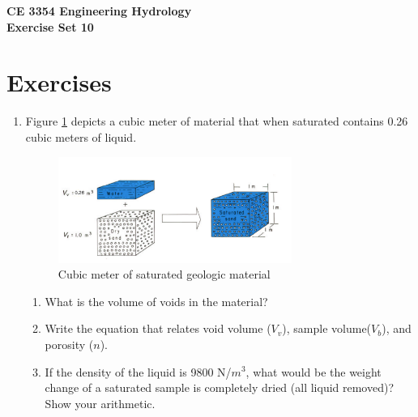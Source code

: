 \documentclass[12pt]{article}
\begin{document}
\begin{center}
{\textbf{{ CE 3354 Engineering Hydrology} \\ {Exercise Set 10}}}
\end{center}

\section*{\small{Exercises}}

\begin{enumerate}
\item Figure \ref{fig:porosity.pdf} depicts a cubic meter of material that when saturated contains 0.26 cubic meters of liquid.
\begin{figure}[h!] %
   \centering
   \includegraphics[width=3in]{porosity.pdf} 
   \caption{Cubic meter of saturated geologic material}
   \label{fig:porosity.pdf}
\end{figure}

\begin{enumerate}
\item What is the volume of voids in the material?
\item Write the equation that relates void volume ($V_v$), sample volume($V_b$), and porosity ($n$).
\item If the density of the liquid is 9800 N/$m^3$, what would be the weight change of a saturated sample is completely dried (all liquid removed)?  Show your arithmetic.
\end{enumerate}

\clearpage


\end{enumerate}
\end{document}
